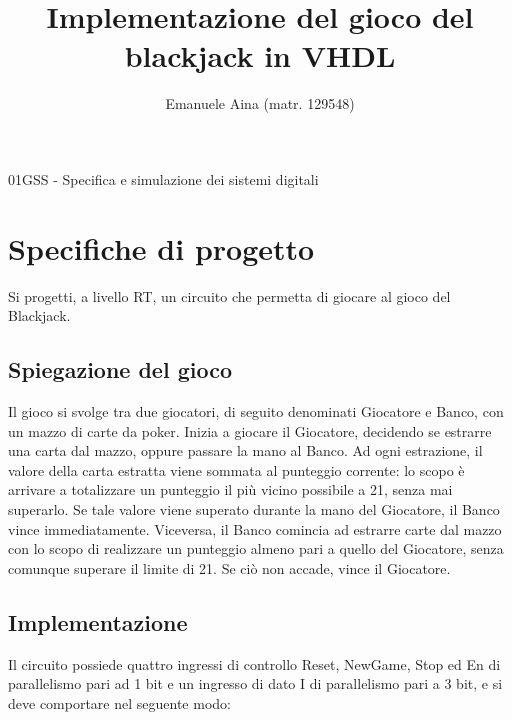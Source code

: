 \documentclass [11pt,a4paper,oneside,draft]{article}
\title{Implementazione del gioco del blackjack in VHDL}
\author{Emanuele Aina (matr. 129548)}
\date{}
\begin{document}
\maketitle

\begin{center}
\small{01GSS - Specifica e simulazione dei sistemi digitali}
\end{center}

\section{Specifiche di progetto}
Si progetti, a livello RT, un circuito che permetta di giocare al gioco del Blackjack.

\subsection{Spiegazione del gioco}
Il gioco si svolge tra due giocatori, di seguito denominati
Giocatore e Banco, con un mazzo di carte da poker. Inizia a giocare il Giocatore,
decidendo se estrarre una carta dal mazzo, oppure passare la mano al Banco. Ad ogni
estrazione, il valore della carta estratta viene sommata al punteggio corrente: lo scopo
è arrivare a totalizzare un punteggio il più vicino possibile a 21, senza mai superarlo.
Se tale valore viene superato durante la mano del Giocatore, il Banco vince
immediatamente. Viceversa, il Banco comincia ad estrarre carte dal mazzo con lo
scopo di realizzare un punteggio almeno pari a quello del Giocatore, senza comunque
superare il limite di 21. Se ciò non accade, vince il Giocatore.

\subsection{Implementazione}
Il circuito possiede quattro ingressi di controllo Reset, NewGame,
Stop ed En di parallelismo pari ad 1 bit e un ingresso di dato I di parallelismo pari a
3 bit, e si deve comportare nel seguente modo:
\end{document}
